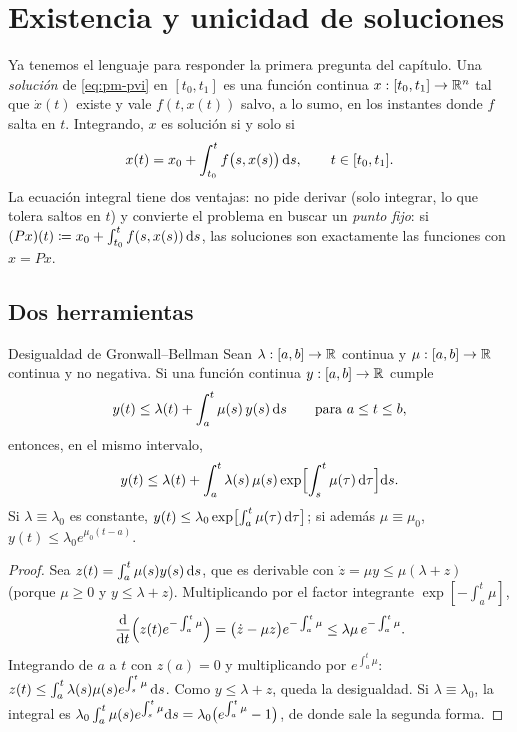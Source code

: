 \section{Existencia y unicidad de soluciones}
\label{sec:pm-existencia}

Ya tenemos el lenguaje para responder la primera pregunta del capítulo. Una \emph{solución} de \eqref{eq:pm-pvi} en $[t_0,t_1]$ es una función continua $x:[t_0,t_1]\to\mathbb{R}^n$ tal que $\dot x(t)$ existe y vale $f(t,x(t))$ salvo, a lo sumo, en los instantes donde $f$ salta en $t$. Integrando, $x$ es solución si y solo si
\begin{equation}
  x(t)=x_0+\int_{t_0}^tf\bigl(s,x(s)\bigr)\,\mathrm{d} s,\qquad t\in[t_0,t_1] .
  \label{eq:pm-integral}
\end{equation}
La ecuación integral tiene dos ventajas: no pide derivar (solo integrar, lo que tolera saltos en $t$) y convierte el problema en buscar un \emph{punto fijo}: si $(Px)(t)\coloneqq x_0+\int_{t_0}^tf(s,x(s))\,\mathrm{d} s$, las soluciones son exactamente las funciones con $x=Px$.

\subsection{Dos herramientas}

\begin{lema}[label=lem:pm-gronwall]{Desigualdad de Gronwall--Bellman \citep[Lema~A.1]{Kha02}}
Sean $\lambda:[a,b]\to\mathbb{R}$ continua y $\mu:[a,b]\to\mathbb{R}$ continua y no negativa. Si una función continua $y:[a,b]\to\mathbb{R}$ cumple
\[
  y(t)\le\lambda(t)+\int_a^t\mu(s)\,y(s)\,\mathrm{d} s\qquad\text{para }a\le t\le b,
\]
entonces, en el mismo intervalo,
\[
  y(t)\le\lambda(t)+\int_a^t\lambda(s)\,\mu(s)\exp\Bigl[\int_s^t\mu(\tau)\,\mathrm{d}\tau\Bigr]\mathrm{d} s .
\]
Si $\lambda\equiv\lambda_0$ es constante, $y(t)\le\lambda_0\exp\bigl[\int_a^t\mu(\tau)\,\mathrm{d}\tau\bigr]$; si además $\mu\equiv\mu_0$, $y(t)\le\lambda_0e^{\mu_0(t-a)}$.
\end{lema}

\begin{proof}
Sea $z(t)=\int_a^t\mu(s)y(s)\,\mathrm{d} s$, que es derivable con $\dot z=\mu y\le\mu(\lambda+z)$ (porque $\mu\ge0$ y $y\le\lambda+z$). Multiplicando por el factor integrante $\exp[-\int_a^t\mu]$,
\[
  \frac{\mathrm{d}}{\mathrm{d} t}\Bigl(z(t)e^{-\int_a^t\mu}\Bigr)=\bigl(\dot z-\mu z\bigr)e^{-\int_a^t\mu}\le\lambda\mu\,e^{-\int_a^t\mu}.
\]
Integrando de $a$ a $t$ con $z(a)=0$ y multiplicando por $e^{\int_a^t\mu}$: $z(t)\le\int_a^t\lambda(s)\mu(s)e^{\int_s^t\mu}\,\mathrm{d} s$. Como $y\le\lambda+z$, queda la desigualdad. Si $\lambda\equiv\lambda_0$, la integral es $\lambda_0\int_a^t\mu(s)e^{\int_s^t\mu}\mathrm{d} s=\lambda_0\bigl(e^{\int_a^t\mu}-1\bigr)$, de donde sale la segunda forma.
\end{proof}

